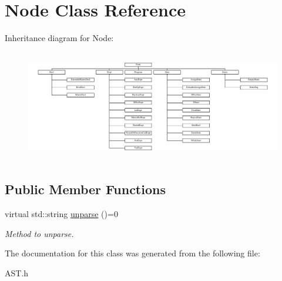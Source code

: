 \hypertarget{classNode}{\section{Node Class Reference}
\label{classNode}
}
Inheritance diagram for Node\-:\begin{figure}[H]
\begin{center}
\leavevmode
\includegraphics[height=4.912281cm]{classNode}
\end{center}
\end{figure}
\subsection*{Public Member Functions}
\begin{DoxyCompactItemize}
\item 
\hypertarget{classNode_a60ea533e0900961c05e701db70097136}{virtual std\-::string \hyperlink{classNode_a60ea533e0900961c05e701db70097136}{unparse} ()=0}\label{classNode_a60ea533e0900961c05e701db70097136}

\begin{DoxyCompactList}\small\item\em Method to unparse. \end{DoxyCompactList}\end{DoxyCompactItemize}


The documentation for this class was generated from the following file\-:\begin{DoxyCompactItemize}
\item 
A\-S\-T.\-h\end{DoxyCompactItemize}

